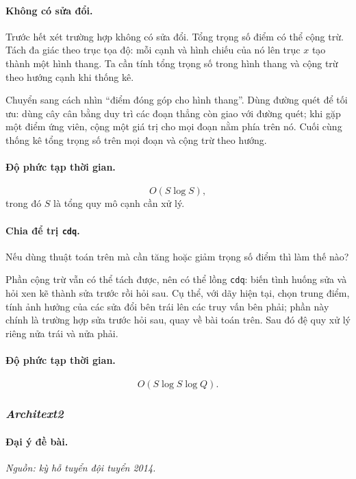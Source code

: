 \documentclass[11pt]{article}
\begin{document}
\paragraph{Không có sửa đổi.}
Trước hết xét trường hợp không có sửa đổi. Tổng trọng số điểm có thể cộng trừ.
Tách đa giác theo trục tọa độ: mỗi cạnh và hình chiếu của nó lên trục \(x\) tạo
thành một hình thang. Ta cần tính tổng trọng số trong hình thang và cộng trừ
theo hướng cạnh khi thống kê.

Chuyển sang cách nhìn ``điểm đóng góp cho hình thang''. Dùng đường quét để tối
ưu: dùng cây cân bằng duy trì các đoạn thẳng còn giao với đường quét; khi gặp
một điểm ứng viên, cộng một giá trị cho mọi đoạn nằm phía trên nó. Cuối cùng
thống kê tổng trọng số trên mọi đoạn và cộng trừ theo hướng.

\paragraph{Độ phức tạp thời gian.}
\[
  O(S\log S),
\]
trong đó \(S\) là tổng quy mô cạnh cần xử lý.

\paragraph{Chia để trị \texttt{cdq}.}
Nếu dùng thuật toán trên mà cần tăng hoặc giảm trọng số điểm thì làm thế nào?

Phần cộng trừ vẫn có thể tách được, nên có thể lồng \texttt{cdq}: biến tình
huống sửa và hỏi xen kẽ thành sửa trước rồi hỏi sau. Cụ thể, với dãy hiện tại,
chọn trung điểm, tính ảnh hưởng của các sửa đổi bên trái lên các truy vấn bên
phải; phần này chính là trường hợp sửa trước hỏi sau, quay về bài toán trên.
Sau đó đệ quy xử lý riêng nửa trái và nửa phải.

\paragraph{Độ phức tạp thời gian.}
\[
  O(S\log S\log Q).
\]

\subsubsection{\emph{Architext2}}

\paragraph{Đại ý đề bài.}
\emph{Nguồn: kỳ hỗ tuyển đội tuyển 2014.}
\end{document}
